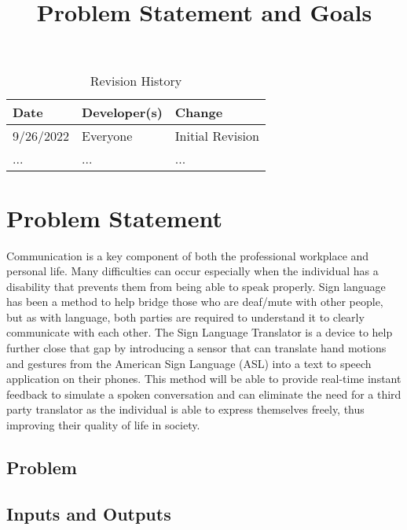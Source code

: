 \documentclass{article}
\title{Problem Statement and Goals\\\progname}
\author{\authname}
\date{}
\begin{document}
\maketitle

\begin{table}[hp]
\caption{Revision History} \label{TblRevisionHistory}
\begin{tabularx}{\textwidth}{llX}
\toprule
\textbf{Date} & \textbf{Developer(s)} & \textbf{Change}\\
\midrule
9/26/2022 & Everyone & Initial Revision\\
... & ... & ...\\
\bottomrule
\end{tabularx}
\end{table}

\section{Problem Statement}

Communication is a key component of both the professional workplace and personal life. Many difficulties
can occur especially when the individual has a disability that prevents them from being able to speak properly.
Sign language has been a method to help bridge those who are deaf/mute with other people, but as with language,
both parties are required to understand it to clearly communicate with each other. The Sign Language Translator
is a device to help further close that gap by introducing a sensor that can translate hand motions and gestures
from the American Sign Language (ASL) into a text to speech application on their phones. This method will be able
to provide real-time instant feedback to simulate a spoken conversation and can eliminate the need for a third party
translator as the individual is able to express themselves freely, thus improving their quality of life in society. 

\subsection{Problem}

\subsection{Inputs and Outputs}

\end{document}
